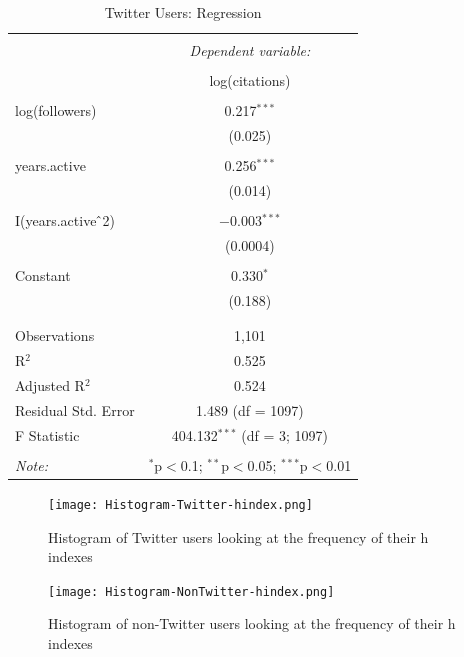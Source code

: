\documentclass[12pt, Times New Roman]{article}
\begin{document}
\begin{table}[!htbp] \centering 
  \caption{Twitter Users: Regression} 
  \label{table4} 
\begin{tabular}{@{\extracolsep{5pt}}lc} 
\\[-1.8ex]\hline 
\hline \\[-1.8ex] 
 & \multicolumn{1}{c}{\textit{Dependent variable:}} \\ 
\cline{2-2} 
\\[-1.8ex] & log(citations) \\ 
\hline \\[-1.8ex] 
 log(followers) & 0.217$^{***}$ \\ 
  & (0.025) \\ 
  & \\ 
 years.active & 0.256$^{***}$ \\ 
  & (0.014) \\ 
  & \\ 
 I(years.active$\hat{\mkern6mu}$2) & $-$0.003$^{***}$ \\ 
  & (0.0004) \\ 
  & \\ 
 Constant & 0.330$^{*}$ \\ 
  & (0.188) \\ 
  & \\ 
\hline \\[-1.8ex] 
Observations & 1,101 \\ 
R$^{2}$ & 0.525 \\ 
Adjusted R$^{2}$ & 0.524 \\ 
Residual Std. Error & 1.489 (df = 1097) \\ 
F Statistic & 404.132$^{***}$ (df = 3; 1097) \\ 
\hline 
\hline \\[-1.8ex] 
\textit{Note:}  & \multicolumn{1}{r}{$^{*}$p$<$0.1; $^{**}$p$<$0.05; $^{***}$p$<$0.01} \\ 
\end{tabular} 
\end{table}

\begin{figure}[h]
    \texttt{[image: Histogram-Twitter-hindex.png]}
    \centering
    \caption{Histogram of Twitter users looking at the frequency of their h indexes}
    \label{Hist1}
\end{figure}

\begin{figure}[h]
    \texttt{[image: Histogram-NonTwitter-hindex.png]}
    \centering
    \caption{Histogram of non-Twitter users looking at the frequency of their h indexes}
    \label{Hist2}
\end{figure}
\end{document}

